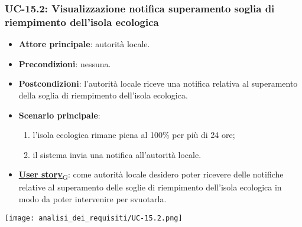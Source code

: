 \subsubsection{UC-15.2: Visualizzazione notifica superamento soglia di riempimento dell'isola ecologica}
\begin{itemize}
	\item \textbf{Attore principale}: autorità locale.
	\item \textbf{Precondizioni}: nessuna.
	\item \textbf{Postcondizioni}: l'autorità locale riceve una notifica relativa al superamento della soglia di riempimento dell'isola ecologica.
	\item \textbf{Scenario principale}:
	      \begin{enumerate}
		      \item l'isola ecologica rimane piena al 100\% per più di 24 ore;
		      \item il sistema invia una notifica all'autorità locale.
	      \end{enumerate}
	\item \href{https://7last.github.io/docs/rtb/documentazione-interna/glossario\#user-story}{\textbf{User story}\textsubscript{G}}:
	      come autorità locale desidero poter ricevere delle notifiche relative al superamento delle soglie di riempimento dell'isola ecologica
	      in modo da poter intervenire per svuotarla.
\end{itemize}
\begin{center}
	\texttt{[image: analisi\_dei\_requisiti/UC-15.2.png]}
\end{center}
